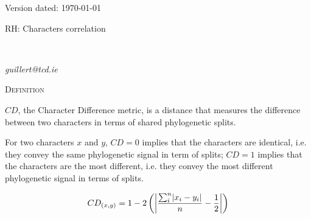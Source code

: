 \documentclass[12pt,letterpaper]{article}
\DeclarePairedDelimiter\abs{\lvert}{\rvert}%
\renewcommand{\section}[1]{%
\bigskip
\begin{center}
\begin{Large}
\normalfont\scshape #1
\medskip
\end{Large}
\end{center}}
\begin{document}
\begin{flushright}
Version dated: \today
\end{flushright}
\bigskip
\noindent RH: Characters correlation

\bigskip
\medskip
\begin{center}


\bigskip


\bigskip

\\

\end{center}
\medskip
{} \textit{guillert@tcd.ie}\\ 
\vspace{1in}

\newpage

\section{Definition}

$CD$, the Character Difference metric, is a distance that measures the difference between two characters in terms of shared phylogenetic splits.

For two characters $x$ and $y$, $CD=0$ implies that the characters are identical, i.e. they convey the same phylogenetic signal in term of splits; $CD=1$ implies that the characters are the most different, i.e. they convey the most different phylogenetic signal in terms of splits.

\begin{equation}
    CD_{(x,y)} = 1 - 2\left(\abs*{\frac{\sum_{i}^{n}\abs{x_{i} - y_{i}}}{n}-\frac{1}{2}}\right)
\end{equation}
\end{document}
